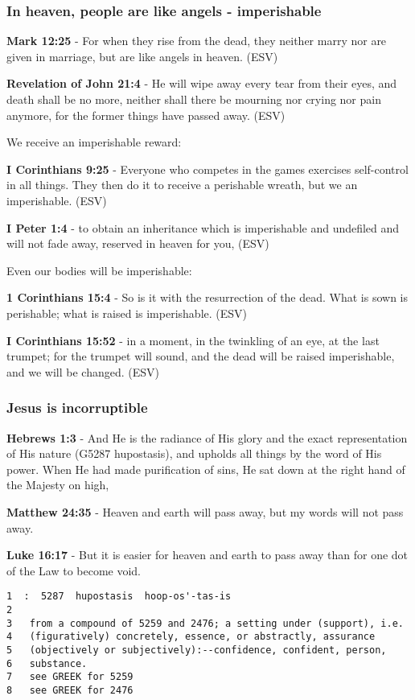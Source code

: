 \documentclass[11pt]{article}
\begin{document}
\subsubsection{In heaven, people are like angels - imperishable}
\label{sec:org51c2cf7}
\textbf{Mark 12:25} -  For when they rise from the dead, they neither marry nor are given in marriage, but are like angels in heaven. (ESV)

\textbf{Revelation of John 21:4} - He will wipe away every tear from their eyes, and death shall be no more, neither shall there be mourning nor crying nor pain anymore, for the former things have passed away. (ESV)

We receive an imperishable reward:

\textbf{I Corinthians 9:25} - Everyone who competes in the games exercises self-control in all things. They then do it to receive a perishable wreath, but we an imperishable. (ESV)

\textbf{I Peter 1:4} - to obtain an inheritance which is imperishable and undefiled and will not fade away, reserved in heaven for you, (ESV)

Even our bodies will be imperishable:

\textbf{1 Corinthians 15:4} -  So is it with the resurrection of the dead.  What is sown is perishable; what is raised is imperishable. (ESV)

\textbf{I Corinthians 15:52} - in a moment, in the twinkling of an eye, at the last trumpet; for the trumpet will sound, and the dead will be raised imperishable, and we will be changed. (ESV)

\subsubsection{Jesus is incorruptible}
\label{sec:orgf936558}
\textbf{Hebrews 1:3} - And He is the radiance of His glory and the exact representation of His nature (G5287 hupostasis), and upholds all things by the word of His power. When He had made purification of sins, He sat down at the right hand of the Majesty on high,

\textbf{Matthew 24:35} - Heaven and earth will pass away, but my words will not pass away.

\textbf{Luke 16:17} - But it is easier for heaven and earth to pass away than for one dot of the Law to become void.

\begin{verbatim}
1  :  5287  hupostasis  hoop-os'-tas-is
2  
3   from a compound of 5259 and 2476; a setting under (support), i.e.
4   (figuratively) concretely, essence, or abstractly, assurance
5   (objectively or subjectively):--confidence, confident, person,
6   substance.
7   see GREEK for 5259
8   see GREEK for 2476
\end{verbatim}
\end{document}
